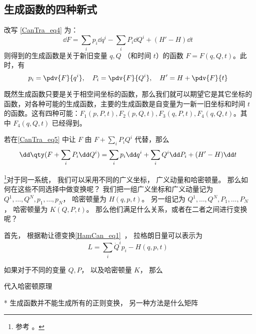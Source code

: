 \subsection{生成函数的四种新式}
改写 \autoref{CanTra_eq4} 为：
\begin{equation}\label{CanTra_eq5}
\dd F=\sum_ip_i\dd q^i-\sum_iP_i\dd Q^i+(H'-H)\dd t
\end{equation}
则得到的生成函数是关于新旧变量 $q,Q$ （和时间 $t$）的函数 $F=F(q,Q,t)$。此时，有
\begin{equation}
p_i=\pdv{F}{q^i},\quad P_i=\pdv{F}{Q^i},\quad H'=H+\pdv{F}{t}
\end{equation}

既然生成函数只要是关于相空间坐标的函数，那么我们就可以期望它是其它坐标的函数，对各种可能的生成函数，主要的生成函数是自变量为一新一旧坐标和时间 $t$ 的函数。这有四种可能：$F_1(p,P,t),F_2(p,Q,t),F_3(q,P,t),F_4(q,Q,t)$。其中 $F_4(q,Q,t)$ 已经得到。

若在\autoref{CanTra_eq5} 中让 $F$ 由 $F+\sum_iP_i Q^i$ 代替，那么
\begin{equation}
\dd\qty(F+\sum_i P_i\dd Q^i)=\sum_i p_i\dd q^i+\sum_i Q^i\dd P_i+(H'-H)\dd t
\end{equation}





\footnote{参考 \cite{Goldstein}。}对于同一系统， 我们可以采用不同的广义坐标， 广义动量和哈密顿量。 那么如何在这些不同选择中做变换呢？ 我们把一组广义坐标和广义动量记为 $Q^1,\dots, Q^N, p_1, \dots, p_N$， 哈密顿量为 $H(q, p, t)$。 另一组记为 $Q^1,\dots, Q^N, P_1, \dots, P_N$， 哈密顿量为 $K(Q, P, t)$。 那么他们满足什么关系，或者在二者之间进行变换呢？

首先， 根据勒让德变换\autoref{HamCan_eq1}~， 拉格朗日量可以表示为
\begin{equation}
L = \sum_i \dot Q^i p_i - H(q, p, t)
\end{equation}

如果对于不同的变量 $Q, P$， 以及哈密顿量 $K$， 那么

代入哈密顿原理

* 生成函数并不能生成所有的正则变换， 另一种方法是什么矩阵
